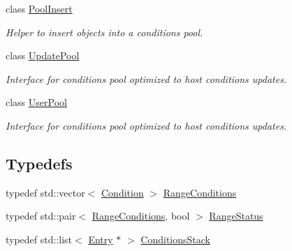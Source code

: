 \begin{DoxyCompactItemize}
class \hyperlink{class_d_d4hep_1_1_conditions_1_1_pool_insert}{Pool\+Insert}
\begin{DoxyCompactList}\small\item\em Helper to insert objects into a conditions pool. \end{DoxyCompactList}\item 
class \hyperlink{class_d_d4hep_1_1_conditions_1_1_update_pool}{Update\+Pool}
\begin{DoxyCompactList}\small\item\em Interface for conditions pool optimized to host conditions updates. \end{DoxyCompactList}\item 
class \hyperlink{class_d_d4hep_1_1_conditions_1_1_user_pool}{User\+Pool}
\begin{DoxyCompactList}\small\item\em Interface for conditions pool optimized to host conditions updates. \end{DoxyCompactList}\end{DoxyCompactItemize}
\subsection*{Typedefs}
\begin{DoxyCompactItemize}
\item 
typedef std\+::vector$<$ \hyperlink{class_d_d4hep_1_1_conditions_1_1_condition}{Condition} $>$ \hyperlink{namespace_d_d4hep_1_1_conditions_ae765f0140a33973a430280f02b6062f4}{Range\+Conditions}
\item 
typedef std\+::pair$<$ \hyperlink{namespace_d_d4hep_1_1_conditions_ae765f0140a33973a430280f02b6062f4}{Range\+Conditions}, bool $>$ \hyperlink{namespace_d_d4hep_1_1_conditions_a6fa51615b9757a9ffccb7377f0617ee4}{Range\+Status}
\item 
typedef std\+::list$<$ \hyperlink{class_d_d4hep_1_1_conditions_1_1_entry}{Entry} $\ast$ $>$ \hyperlink{namespace_d_d4hep_1_1_conditions_ac894ba79dbc97adf0ab8143bdd8bd2e3}{Conditions\+Stack}
\end{DoxyCompactItemize}
